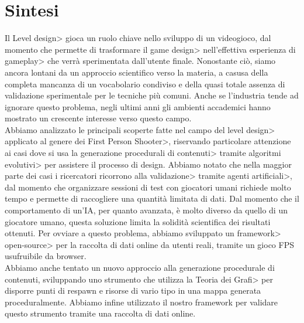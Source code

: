 \chapter{Sintesi}

Il \<Level design> gioca un ruolo chiave nello sviluppo di un videogioco, dal momento che permette di trasformare il \<game design> nell'effettiva esperienza di \<gameplay> che verrà sperimentata dall'utente finale. Nonostante ciò, siamo ancora lontani da un approccio scientifico verso la materia, a casusa della completa mancanza di un vocabolario condiviso e della quasi totale assenza di validazione sperimentale per le tecniche più comuni. Anche se l'industria tende ad ignorare questo problema, negli ultimi anni gli ambienti accademici hanno mostrato un crescente interesse verso questo campo. \\
Abbiamo analizzato le principali scoperte fatte nel campo del \<level design> applicato al genere dei \<First Person Shooter>, riservando particolare attenzione ai casi dove si usa la \<generazione procedurali di contenuti> tramite \<algoritmi evolutivi> per assistere il processo di design. Abbiamo notato che nella maggior parte dei casi i ricercatori ricorrono alla \<validazione> tramite \<agenti artificiali>, dal momento che organizzare sessioni di test con giocatori umani richiede molto tempo e permette di raccogliere una quantità limitata di dati. Dal momento che il comportamento di un'IA, per quanto avanzata, è molto diverso da quello di un giocatore umano, questa soluzione limita la solidità scientifica dei risultati ottenuti. Per ovviare a questo problema, abbiamo sviluppato un \<framework> \<open-source> per la raccolta di dati online da utenti reali, tramite un gioco FPS usufruibile da browser. \\
Abbiamo anche tentato un nuovo approccio alla generazione procedurale di contenuti, sviluppando uno strumento che utilizza la \<Teoria dei Grafi> per disporre punti di respawn e risorse di vario tipo in una mappa generata proceduralmente. Abbiamo infine utilizzato il nostro framework per validare questo strumento tramite una raccolta di dati online.